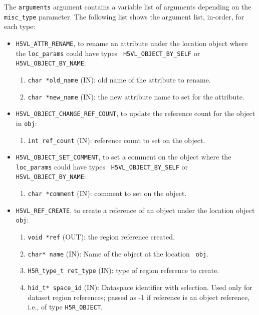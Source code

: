 The {\tt arguments} argument contains a variable list of arguments
depending on the {\tt misc\_type} parameter. The following list shows
the argument list, in-order, for each type:

\begin{itemize}
\item {\tt H5VL\_ATTR\_RENAME}, to rename an attribute under the
  location object where the {\tt loc\_params} could have types {\tt
    H5VL\_OBJECT\_BY\_SELF} or {\tt H5VL\_OBJECT\_BY\_NAME}:
  \begin{enumerate}
  \item {\tt char *old\_name} (IN): old name of the attribute to
    rename.
  \item {\tt char *new\_name} (IN): the new attribute name to set for
    the attribute.
  \end{enumerate}

\item {\tt H5VL\_OBJECT\_CHANGE\_REF\_COUNT}, to update the reference
  count for the object in {\tt obj}:
  \begin{enumerate}
  \item {\tt int ref\_count} (IN): reference count to set on the object.
  \end{enumerate}

\item {\tt H5VL\_OBJECT\_SET\_COMMENT}, to set a comment on the object
  where the {\tt loc\_params} could have types {\tt
    H5VL\_OBJECT\_BY\_SELF} or {\tt H5VL\_OBJECT\_BY\_NAME}:
  \begin{enumerate}
  \item {\tt char *comment} (IN): comment to set on the object.
  \end{enumerate}

\item {\tt H5VL\_REF\_CREATE}, to create a reference of an object
  under the location object {\tt obj}:
  \begin{enumerate}
  \item {\tt void *ref} (OUT): the region reference created.
  \item {\tt char* name} (IN): Name of the object at the location {\tt
      obj}.
  \item {\tt H5R\_type\_t ret\_type} (IN): type of region reference to
    create.
  \item {\tt hid\_t* space\_id} (IN): Dataspace identifier with
    selection. Used only for dataset region references; passed as -1 if
    reference is an object reference, i.e., of type {\tt H5R\_OBJECT}.
  \end{enumerate}
\end{itemize}

